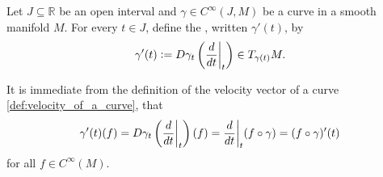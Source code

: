 \begin{definition}
	\label{def:velocity_of_a_curve}
	Let $J \subseteq \mathbb{R}$ be an open interval and $\gamma \in C^\infty(J,M)$ be a curve in a smooth manifold $M$. For every $t \in J$, define the , written $\gamma'(t)$, by
	\begin{equation*}
		\gamma'(t) := D\gamma_t\del[3]{\frac{d}{dt}\bigg\vert_t} \in T_{\gamma(t)}M.
	\end{equation*}
\end{definition}

It is immediate from the definition of the velocity vector of a curve \ref{def:velocity_of_a_curve}, that
\begin{equation*}
	\gamma'(t)(f) = D\gamma_t\del[3]{\frac{d}{dt}\bigg\vert_t}(f) = \frac{d}{dt}\bigg\vert_t(f \circ \gamma) = (f \circ \gamma)'(t)
\end{equation*}
\noindent for all $f \in C^\infty(M)$.
